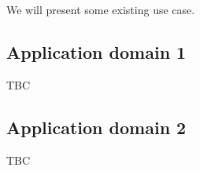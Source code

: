 
We will present some existing use case. 


\subsection{Application domain 1}  TBC
\subsection{Application domain 2}  TBC